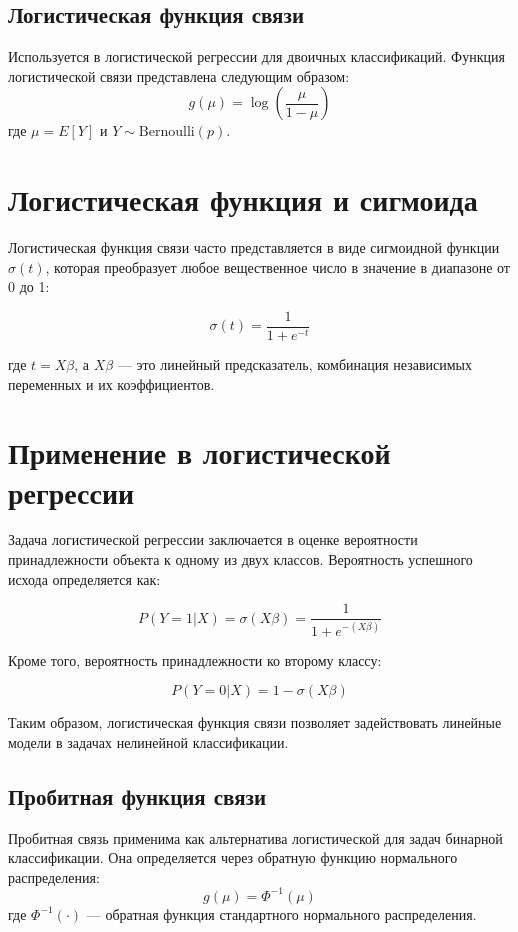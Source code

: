 \begin{itemize}
\subsection*{Логистическая функция связи}

Используется в логистической регрессии для двоичных классификаций. Функция логистической связи представлена следующим образом:
\[
g(\mu) = \log \left( \frac{\mu}{1-\mu} \right)
\]
где $\mu = E[Y]$ и $Y \sim \text{Bernoulli}(p)$.

\section*{Логистическая функция и сигмоида}

Логистическая функция связи часто представляется в виде сигмоидной функции \( \sigma(t) \), которая преобразует любое вещественное число в значение в диапазоне от 0 до 1:

\[
\sigma(t) = \frac{1}{1 + e^{-t}}
\]

где \( t = X\beta \), а \( X\beta \) — это линейный предсказатель, комбинация независимых переменных и их коэффициентов.

\section*{Применение в логистической регрессии}

Задача логистической регрессии заключается в оценке вероятности принадлежности объекта к одному из двух классов. Вероятность успешного исхода определяется как:

\[
P(Y=1 | X) = \sigma(X\beta) = \frac{1}{1 + e^{-(X\beta)}}
\]

Кроме того, вероятность принадлежности ко второму классу:

\[
P(Y=0 | X) = 1 - \sigma(X\beta)
\]

Таким образом, логистическая функция связи позволяет задействовать линейные модели в задачах нелинейной классификации.

\subsection*{Пробитная функция связи}

Пробитная связь применима как альтернатива логистической для задач бинарной классификации. Она определяется через обратную функцию нормального распределения:
\[
g(\mu) = \Phi^{-1}(\mu)
\]
где $\Phi^{-1}(\cdot)$ — обратная функция стандартного нормального распределения.


\end{itemize}
